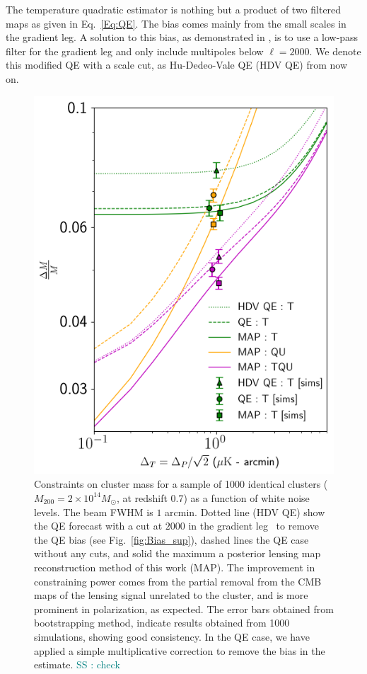 \documentclass[prd, superscriptaddress, tightenlines, longbibliography, nofootinbib, eqsecnum, amsfonts, amsmath, floatfix, twocolumn, notitlepage]{revtex4-2}
\newcommand{\JC}[1]{\color{purple}{{JC:#1}}\color{black}\xspace}
\newcommand{\bb}[1]{\textcolor{teal}{SS : #1}}
\begin{document}
The temperature quadratic estimator is nothing but a product of two filtered maps as given in Eq.~\ref{Eq:QE}. The bias comes mainly from the small scales in the gradient leg. 
A solution to this bias, as demonstrated in \cite{Hu:2007bt}, is to use a low-pass filter for the gradient leg and only include multipoles below $\ell=2000$. We denote this modified QE with a scale cut, as Hu-Dedeo-Vale QE (HDV QE) from now on.
\begin{figure}
    \centering
    \hspace{-1.2cm}
    \includegraphics[width=1.\hsize]{Figures/forcast_snr.png}
    \caption{Constraints on cluster mass for a sample of 1000 identical clusters ($M_{200} = 2\times10^{14}M_{\odot}$, at redshift 0.7) as a function of white noise levels. The beam FWHM is $1$ arcmin. Dotted line (HDV QE) show the QE forecast with a cut at $2000$ in the gradient leg~\cite{Hu:2007bt} to remove the QE bias (see Fig.~\ref{fig:Bias_sup}), dashed lines the QE case without any cuts, and solid the maximum a posterior lensing map reconstruction method of this work (MAP). The improvement in constraining power comes from the partial removal from the CMB maps of the lensing signal unrelated to the cluster, and is more prominent in polarization, as expected. The error bars obtained from bootstrapping method, indicate results obtained from 1000 simulations, showing good consistency. In the QE case, we have applied a simple multiplicative correction to remove the bias in the estimate. \bb{check}}
    \label{fig:forecast}
\end{figure}
\end{document}

